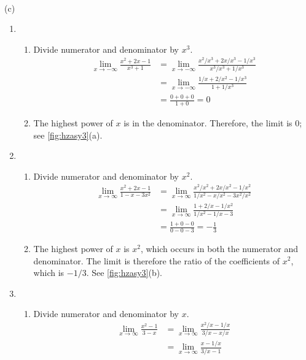 \begin{example}
{
\\ (c)}
%
\begin{enumerate}
	\item	\begin{enumerate}
		\item Divide numerator and denominator by $x^3$.
			\begin{align*}
				\lim_{x\to -\infty} \frac{x^2+2x-1}{x^3+1}
				&= \lim_{x\to -\infty} \frac{x^2/x^3+2x/x^3-1/x^3}{x^3/x^3+1/x^3}\\
				&=\lim_{x\to -\infty} \frac{1/x+2/x^2-1/x^3}{1+1/x^3}\\
				&=\frac{0+0+0}{1+0}=0
			\end{align*}
		\item The highest power of $x$ is in the denominator.  Therefore, the limit is 0; see \autoref{fig:hzasy3}(a).
		\end{enumerate}
	\item	\begin{enumerate}
		\item Divide numerator and denominator by $x^2$.
			\begin{align*}
				\lim_{x\to \infty} \frac{x^2+2x-1}{1-x-3x^2}
				&=\lim_{x\to\infty}
				\frac{x^2/x^2+2x/x^2-1/x^2}{1/x^2-x/x^2-3x^2/x^2}\\
				&=\lim_{x\to \infty} \frac{1+2/x-1/x^2}{1/x^2-1/x-3}\\
				&=\frac{1+0-0}{0-0-3}=-\frac{1}{3}
			\end{align*}
		\item The highest power of $x$ is $x^2$, which occurs in both the numerator and denominator.  The limit is therefore the ratio of the coefficients of $x^2$, which is $-1/3$. See \autoref{fig:hzasy3}(b).
		\end{enumerate}
	\item	\begin{enumerate}
		\item Divide numerator and denominator by $x$.
			\begin{align*}
				\lim_{x\to\infty}\frac{x^2-1}{3-x}
				&=\lim_{x\to \infty}\frac{x^2/x-1/x}{3/x-x/x}\\
				&=\lim_{x\to \infty}\frac{x-1/x}{3/x-1}\\

\end{align*}
\end{enumerate}
\end{enumerate}
\end{example}
